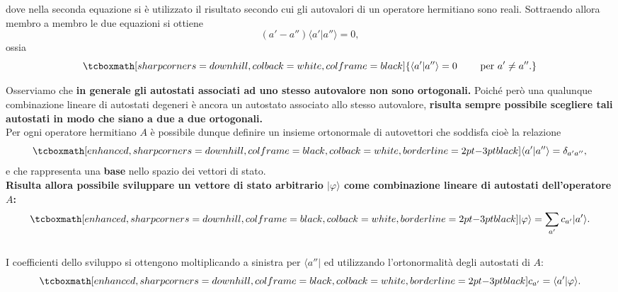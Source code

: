 \begin{enumerate}
\begin{equation}
	\end{equation}
dove nella seconda equazione si è utilizzato il risultato secondo cui gli autovalori di un operatore hermitiano sono reali. Sottraendo allora membro a membro le due equazioni si ottiene
	\begin{equation}
		(a'-a'') \langle a' \vert a'' \rangle =0,
	\end{equation}
ossia
	\begin{equation}
		\tcboxmath[sharp corners=downhill, colback=white, colframe=black]{
		\langle a' \vert a'' \rangle =0 \qquad \textrm{ per } a' \neq a'' .
		}
	\end{equation}
\end{enumerate}

Osserviamo che \textbf{in generale gli autostati associati ad uno stesso autovalore non sono ortogonali.} Poiché però una qualunque combinazione lineare di autostati degeneri è ancora un autostato associato allo stesso autovalore, \textbf{risulta sempre possibile scegliere tali autostati in modo che siano a due a due ortogonali.}\\

Per ogni operatore hermitiano $A$ è possibile dunque definire un insieme ortonormale di autovettori che soddisfa cioè la relazione 
	\begin{equation}
		\tcboxmath[enhanced, sharp corners=downhill, colframe=black, colback=white, borderline={2pt}{-3pt}{black}]{
			\langle a' \vert a'' \rangle = \delta _{a' a''},
			}
	\end{equation}
e che rappresenta una \textbf{base} nello spazio dei vettori di stato.\\

\textbf{Risulta allora possibile sviluppare un vettore di stato arbitrario $\vert \varphi \rangle $ come combinazione lineare di autostati dell'operatore $A$:}
	\begin{equation}
		\tcboxmath[enhanced, sharp corners=downhill, colframe=black, colback=white, borderline={2pt}{-3pt}{black}]{
			\vert \varphi \rangle = \sum _{a'} c_{a'} \vert a' \rangle .
			}
	\end{equation}
\\

I coefficienti dello sviluppo si ottengono moltiplicando  a sinistra per $\langle a'' \vert $ ed utilizzando l'ortonormalità degli autostati di $A$:
	\begin{equation}
		\tcboxmath[enhanced, sharp corners=downhill, colframe=black, colback=white, borderline={2pt}{-3pt}{black}]{
			c_{a'} = \langle a' \vert \varphi \rangle .
			}
	\end{equation}
	\\
	
